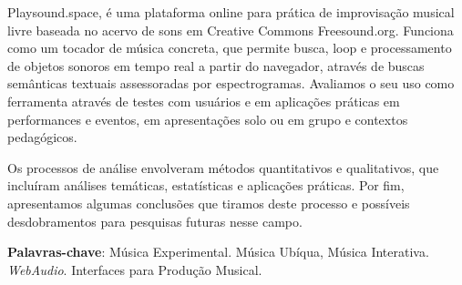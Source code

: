 \documentclass[
	12pt,				%
	openright,			%
	twoside,			%
	a4paper,			%
	english,			%
	french,				%
	spanish,			%
	brazil				%
	]{abntex2}
\begin{document}
\begin{resumo}
Playsound.space, é uma plataforma online para prática de improvisação musical livre baseada no acervo de sons em Creative Commons Freesound.org. Funciona como um tocador de música concreta, que permite busca, loop e processamento de objetos sonoros em tempo real a partir do navegador, através de buscas semânticas textuais assessoradas por espectrogramas. Avaliamos o seu uso como ferramenta através de testes com usuários e em aplicações práticas em performances e eventos, em apresentações solo ou em grupo e contextos pedagógicos.

Os processos de análise envolveram métodos quantitativos e qualitativos, que incluíram análises temáticas, estatísticas e aplicações práticas. Por fim, apresentamos algumas conclusões que tiramos deste processo e possíveis desdobramentos para pesquisas futuras nesse campo.













 \textbf{Palavras-chave}: Música Experimental. Música Ubíqua, Música Interativa. \textit{WebAudio}. Interfaces para Produção Musical. 
\end{resumo}
\end{document}
